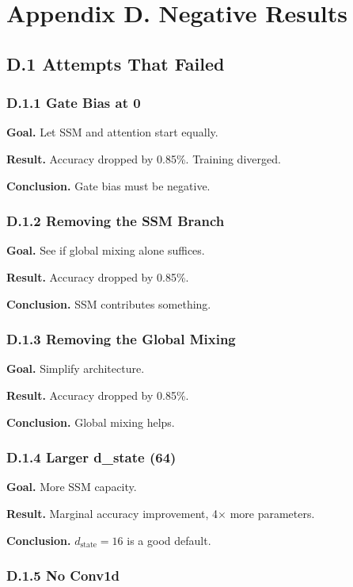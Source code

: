 
\section{Appendix D. Negative Results}

\subsection{D.1 Attempts That Failed}

\subsubsection{D.1.1 Gate Bias at 0}

\textbf{Goal.} Let SSM and attention start equally.

\textbf{Result.} Accuracy dropped by 0.85\%. Training diverged.

\textbf{Conclusion.} Gate bias must be negative.

\subsubsection{D.1.2 Removing the SSM Branch}

\textbf{Goal.} See if global mixing alone suffices.

\textbf{Result.} Accuracy dropped by 0.85\%.

\textbf{Conclusion.} SSM contributes something.

\subsubsection{D.1.3 Removing the Global Mixing}

\textbf{Goal.} Simplify architecture.

\textbf{Result.} Accuracy dropped by 0.85\%.

\textbf{Conclusion.} Global mixing helps.

\subsubsection{D.1.4 Larger d\_state (64)}

\textbf{Goal.} More SSM capacity.

\textbf{Result.} Marginal accuracy improvement, 4$\times$ more parameters.

\textbf{Conclusion.} $d_\text{state} = 16$ is a good default.

\subsubsection{D.1.5 No Conv1d}

